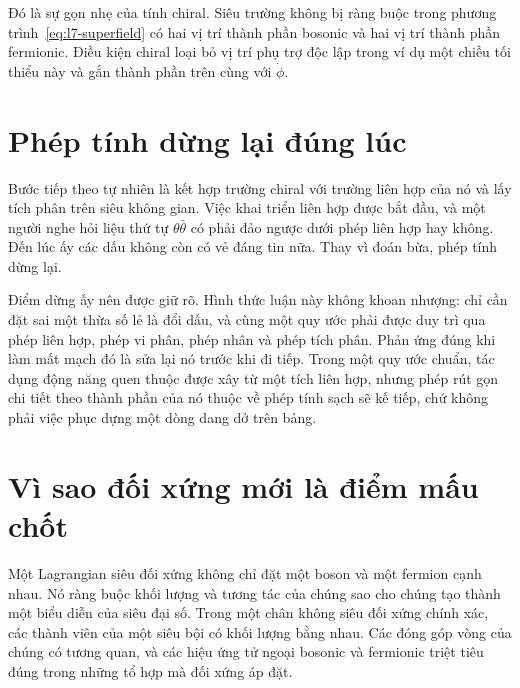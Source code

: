 Đó là sự gọn nhẹ của tính chiral. Siêu trường không bị ràng buộc trong phương trình~\eqref{eq:l7-superfield} có hai vị trí thành phần bosonic và hai vị trí thành phần fermionic. Điều kiện chiral loại bỏ vị trí phụ trợ độc lập trong ví dụ một chiều tối thiểu này và gắn thành phần trên cùng với \(\dot\phi\).

\section{Phép tính dừng lại đúng lúc}

Bước tiếp theo tự nhiên là kết hợp trường chiral với trường liên hợp của nó và lấy tích phân trên siêu không gian. Việc khai triển liên hợp được bắt đầu, và một người nghe hỏi liệu thứ tự \(\theta\bar\theta\) có phải đảo ngược dưới phép liên hợp hay không. Đến lúc ấy các dấu không còn có vẻ đáng tin nữa. Thay vì đoán bừa, phép tính dừng lại.

\begin{classroomqa}
\end{classroomqa}

Điểm dừng ấy nên được giữ rõ. Hình thức luận này không khoan nhượng: chỉ cần đặt sai một thừa số lẻ là đổi dấu, và cùng một quy ước phải được duy trì qua phép liên hợp, phép vi phân, phép nhân và phép tích phân. Phản ứng đúng khi làm mất mạch đó là sửa lại nó trước khi đi tiếp. Trong một quy ước chuẩn, tác dụng động năng quen thuộc được xây từ một tích liên hợp, nhưng phép rút gọn chi tiết theo thành phần của nó thuộc về phép tính sạch sẽ kế tiếp, chứ không phải việc phục dựng một dòng dang dở trên bảng.

\section{Vì sao đối xứng mới là điểm mấu chốt}

Một Lagrangian siêu đối xứng không chỉ đặt một boson và một fermion cạnh nhau. Nó ràng buộc khối lượng và tương tác của chúng sao cho chúng tạo thành một biểu diễn của siêu đại số. Trong một chân không siêu đối xứng chính xác, các thành viên của một siêu bội có khối lượng bằng nhau. Các đóng góp vòng của chúng có tương quan, và các hiệu ứng tử ngoại bosonic và fermionic triệt tiêu đúng trong những tổ hợp mà đối xứng áp đặt.

